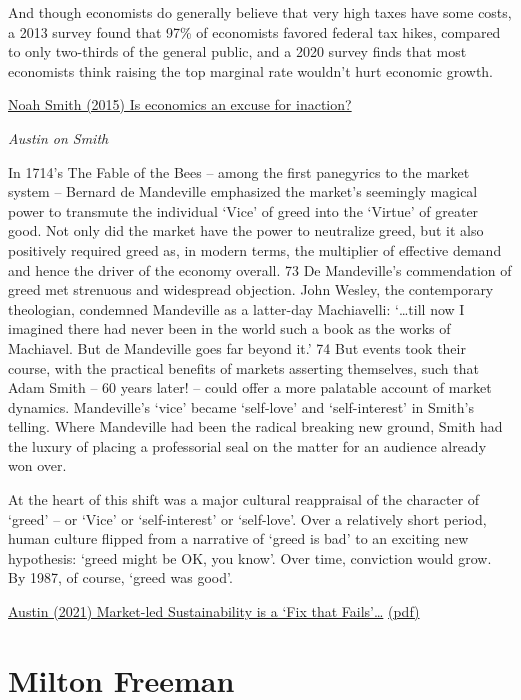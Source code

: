 \documentclass[
]{book}
\begin{document}
And though economists do generally believe that very high taxes have some costs, a 2013 survey found that 97\% of economists favored federal tax hikes, compared to only two-thirds of the general public, and a 2020 survey finds that most economists think raising the top marginal rate wouldn't hurt economic growth.

\href{https://noahpinion.substack.com/p/is-economics-an-excuse-for-inaction}{Noah Smith (2015) Is economics an excuse for inaction?}

\emph{Austin on Smith}

In 1714's The Fable of the Bees -- among the first panegyrics to the market system -- Bernard de
Mandeville emphasized the market's seemingly magical power to transmute the individual `Vice' of
greed into the `Virtue' of greater good. Not only did the market have the power to neutralize greed,
but it also positively required greed as, in modern terms, the multiplier of effective demand and
hence the driver of the economy overall. 73
De Mandeville's commendation of greed met strenuous and widespread objection. John Wesley, the
contemporary theologian, condemned Mandeville as a latter-day Machiavelli:
`\ldots till now I imagined there had never been in the world such a book as the works of
Machiavel. But de Mandeville goes far beyond it.' 74
But events took their course, with the practical benefits of markets asserting themselves, such that
Adam Smith -- 60 years later! -- could offer a more palatable account of market dynamics.
Mandeville's `vice' became `self-love' and `self-interest' in Smith's telling. Where Mandeville had
been the radical breaking new ground, Smith had the luxury of placing a professorial seal on the
matter for an audience already won over.

At the heart of this shift was a major cultural reappraisal of the character of `greed' -- or `Vice' or
`self-interest' or `self-love'. Over a relatively short period, human culture flipped from a narrative of
`greed is bad' to an exciting new hypothesis: `greed might be OK, you know'. Over time, conviction
would grow. By 1987, of course, `greed was good'.

\href{https://bothbrainsrequire\%20d.com/2021/10/25/fix-that-fails/}{Austin (2021) Market-led Sustainability is a `Fix that Fails'\ldots{}}
\href{pdf/Austin_2021_Market_Led_Sustainability_Fix_Fails.pdf}{(pdf)}

\hypertarget{milton-freeman}{%
\section{Milton Freeman}\label{milton-freeman}}
\end{document}
